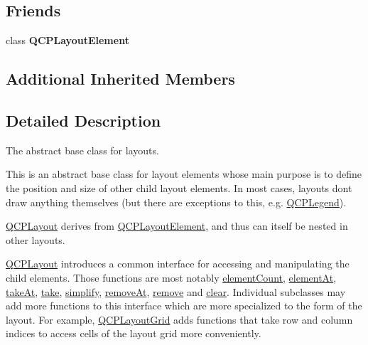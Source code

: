 \subsection*{Friends}
\begin{DoxyCompactItemize}
\item 
class {\bfseries Q\+C\+P\+Layout\+Element}\hypertarget{classQCPLayout_a0790750c7e7f14fdbd960d172655b42b}{}\label{classQCPLayout_a0790750c7e7f14fdbd960d172655b42b}

\end{DoxyCompactItemize}
\subsection*{Additional Inherited Members}


\subsection{Detailed Description}
The abstract base class for layouts. 

This is an abstract base class for layout elements whose main purpose is to define the position and size of other child layout elements. In most cases, layouts don\textquotesingle{}t draw anything themselves (but there are exceptions to this, e.\+g. \hyperlink{classQCPLegend}{Q\+C\+P\+Legend}).

\hyperlink{classQCPLayout}{Q\+C\+P\+Layout} derives from \hyperlink{classQCPLayoutElement}{Q\+C\+P\+Layout\+Element}, and thus can itself be nested in other layouts.

\hyperlink{classQCPLayout}{Q\+C\+P\+Layout} introduces a common interface for accessing and manipulating the child elements. Those functions are most notably \hyperlink{classQCPLayout_a39d3e9ef5d9b82ab1885ba1cb9597e56}{element\+Count}, \hyperlink{classQCPLayout_afa73ca7d859f8a3ee5c73c9b353d2a56}{element\+At}, \hyperlink{classQCPLayout_a5a79621fa0a6eabb8b520cfc04fb601a}{take\+At}, \hyperlink{classQCPLayout_ada26cd17e56472b0b4d7fbbc96873e4c}{take}, \hyperlink{classQCPLayout_a41e6ac049143866e8f8b4964efab01b2}{simplify}, \hyperlink{classQCPLayout_a2403f684fee3ce47132faaeed00bb066}{remove\+At}, \hyperlink{classQCPLayout_a6c58f537d8086f352576ab7c5b15d0bc}{remove} and \hyperlink{classQCPLayout_a02883bdf2769b5b227f0232dba1ac4ee}{clear}. Individual subclasses may add more functions to this interface which are more specialized to the form of the layout. For example, \hyperlink{classQCPLayoutGrid}{Q\+C\+P\+Layout\+Grid} adds functions that take row and column indices to access cells of the layout grid more conveniently.

